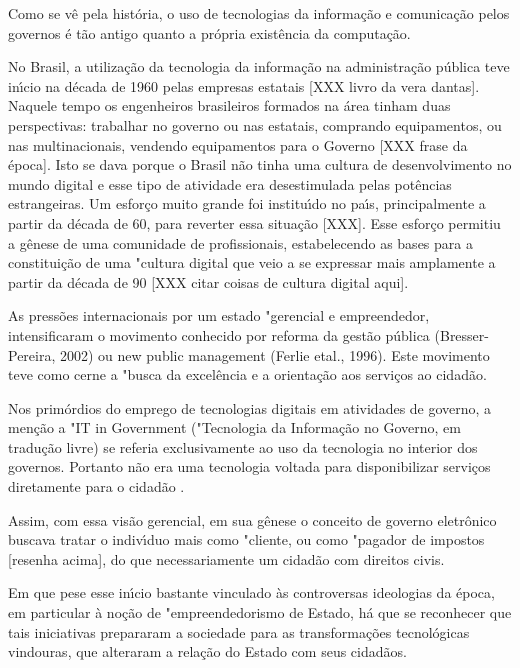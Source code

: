 \documentclass[
12pt,		%
openright,	%
twoside,  %
a4paper,			%
chapter=TITLE,		%
english,			%
french,				%
spanish,			%
brazil				%
]{USPSC-classe/USPSC}
\begin{document}
Como se v\^e pela hist\'oria, o uso de tecnologias da informa\c{c}\~ao e comunica\c{c}\~ao pelos governos \'e t\~ao antigo quanto a pr\'opria exist\^encia da computa\c{c}\~ao.


No Brasil, a utiliza\c{c}\~ao da tecnologia da informa\c{c}\~ao na administra\c{c}\~ao p\'ublica teve in\'{\i}cio na d\'ecada de 1960 pelas empresas estatais [XXX livro da vera dantas]. Naquele tempo os engenheiros brasileiros formados na \'area tinham duas perspectivas: trabalhar no governo ou nas estatais, comprando equipamentos, ou nas multinacionais, vendendo equipamentos para o Governo [XXX frase da \'epoca]. Isto se dava porque o Brasil n\~ao tinha uma cultura de desenvolvimento no mundo digital e esse tipo de atividade era desestimulada pelas pot\^encias estrangeiras. Um esfor\c{c}o muito grande foi institu\'{\i}do no pa\'{\i}s, principalmente a partir da d\'ecada de 60, para reverter essa situa\c{c}\~ao [XXX]. Esse esfor\c{c}o permitiu a g\^enese de uma comunidade de profissionais, estabelecendo as bases para a constitui\c{c}\~ao de uma "cultura digital que veio a se expressar mais amplamente a partir da d\'ecada de 90 [XXX citar coisas de cultura digital aqui].


As press\~oes internacionais por um estado "gerencial e empreendedor, intensificaram o movimento conhecido por reforma da gest\~ao p\'ublica (Bresser-Pereira, 2002) ou new public management (Ferlie etal., 1996). Este movimento teve como cerne a "busca da excel\^encia e a orienta\c{c}\~ao aos servi\c{c}os ao cidad\~ao.


Nos prim\'ordios do emprego de tecnologias digitais em atividades de governo, a men\c{c}\~ao a "IT in Government ("Tecnologia da Informa\c{c}\~ao no Governo, em tradu\c{c}\~ao livre) se referia exclusivamente ao uso da tecnologia no interior dos governos. Portanto n\~ao era uma tecnologia voltada para disponibilizar servi\c{c}os diretamente para o cidad\~ao .


Assim, com essa vis\~ao gerencial, em sua g\^enese o conceito de governo eletr\^onico buscava tratar o indiv\'{\i}duo mais como "cliente, ou como "pagador de impostos [resenha acima], do que necessariamente um cidad\~ao com direitos civis.


Em que pese esse in\'{\i}cio bastante vinculado \`as controversas ideologias da \'epoca, em particular \`a no\c{c}\~ao de "empreendedorismo de Estado, h\'a que se reconhecer que tais iniciativas prepararam a sociedade para as transforma\c{c}\~oes tecnol\'ogicas vindouras, que alteraram a rela\c{c}\~ao do Estado com seus cidad\~aos.
\end{document}
